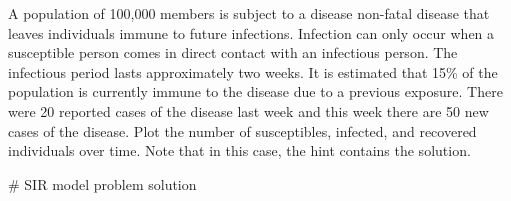 \documentclass{ximera}
\begin{document}
\begin{question}
A population of 100,000 members is subject to a disease non-fatal disease that leaves individuals immune to future infections. Infection can only occur when a susceptible person comes in direct contact with an infectious person. The infectious period lasts approximately two weeks. It is estimated that 15\% of the population is currently immune to the disease due to a previous exposure. There were 20 reported cases of the disease last week and this week there are 50 new cases of the disease. Plot the number of susceptibles, infected, and recovered individuals over time. Note that in this case,
the hint contains the solution.
\begin{hint}
	\begin{sageCell}
	# SIR model problem solution

	\end{sageCell}
\end{hint}
\end{question}
\end{document}
